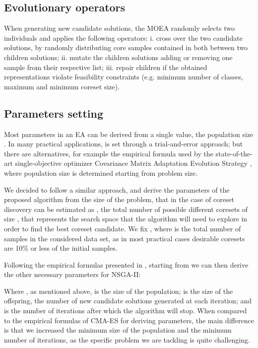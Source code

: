 \documentclass{article}
\begin{document}
\subsection{Evolutionary operators}
\label{ssec:alberto:evolutionary_operators}
When generating new candidate solutions, the MOEA randomly selects two individuals and applies the following operators: i. cross over the two candidate solutions, by randomly distributing core samples contained in both between two children solutions; ii. mutate the children solutions adding or removing one sample from their respective list; iii. repair children if the obtained representations violate feasibility constraints (e.g. minimum number of classes, maximum and minimum coreset size).


\subsection{Parameters setting}
\label{ssec:hyperparameters}
Most parameters in an EA can be derived from a single value, the population size . In many practical applications,  is set through a trial-and-error approach; but there are alternatives, for example the empirical formula used by the state-of-the-art single-objective optimizer Covariance Matrix Adaptation Evolution Strategy \cite{hansen2001completely}, where population size is determined starting from problem size.

We decided to follow a similar approach, and derive the parameters of the proposed algorithm from the size of the problem, that in the case of coreset discovery can be estimated as , the total number of possible different coresets of size , that represents the search space that the algorithm will need to explore in order to find the best coreset candidate. We fix , where  is the total number of samples in the considered data set, as in most practical cases desirable coresets are 10\% or less of the initial samples.

Following the empirical formulas presented in \cite{hansen2001completely}, starting from  we can then derive the other necessary parameters for NSGA-II:



Where , as mentioned above, is the size of the population;  is the size of the offspring, the number of new candidate solutions generated at each iteration; and  is the number of iterations after which the algorithm will stop. When compared to the empirical formulas of CMA-ES for deriving parameters, the main difference is that we increased the minimum size of the population and the minimum number of iterations, as the specific problem we are tackling is quite challenging.
\end{document}
